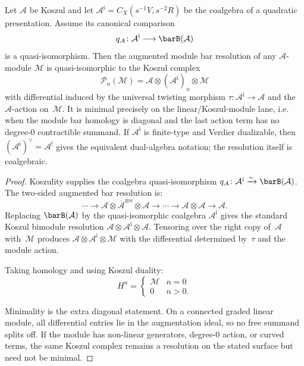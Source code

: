\begin{theorem}
\label{thm:koszul-resolution-module}
Let $\mathcal{A}$ be Koszul and let
$\mathcal{A}^{\mathrm{i}}=C_X(s^{-1}V,s^{-2}R)$ be the coalgebra of a
quadratic presentation.  Assume its canonical comparison
\[
 q_{\mathcal A}\colon\mathcal A^{\mathrm i}\longrightarrow
 \barB(\mathcal A)
\]
is a quasi-isomorphism. Then the augmented module bar resolution of any
$\mathcal{A}$-module $\mathcal{M}$ is quasi-isomorphic to the
Koszul complex
\[
\mathcal{P}_n(\mathcal{M}) =
\mathcal{A} \otimes (\mathcal{A}^{\mathrm{i}})_n
\otimes \mathcal{M}
\]
with differential induced by the universal twisting morphism
$\tau\colon\mathcal A^{\mathrm i}\to\mathcal A$ and the
$\mathcal A$-action on~$\mathcal M$. It is minimal precisely on the
linear/Koszul-module lane, i.e. when the module bar homology is
diagonal and the last action term has no degree-$0$ contractible
summand. If
$\mathcal{A}^{\mathrm{i}}$ is finite-type and Verdier dualizable, then
$(\mathcal{A}^{\mathrm{i}})^\vee=\mathcal{A}^!$ gives the equivalent
dual-algebra notation; the resolution itself is coalgebraic.
\end{theorem}

\begin{proof}
Koszulity supplies the coalgebra quasi-isomorphism
$q_{\mathcal A}\colon\mathcal A^{\mathrm i}\xrightarrow{\sim}
\barB(\mathcal A)$.
The two-sided augmented bar resolution is:
\[
\cdots \to
\mathcal{A} \otimes \overline{\mathcal{A}}^{\otimes n}
\otimes\mathcal A
\to \cdots \to
\mathcal{A}\otimes\mathcal A \to \mathcal{A}.
\]
Replacing $\barB(\mathcal A)$ by the quasi-isomorphic coalgebra
$\mathcal A^{\mathrm i}$ gives the standard Koszul bimodule
resolution
$\mathcal A\otimes\mathcal A^{\mathrm i}\otimes\mathcal A$.
Tensoring over the right copy of~$\mathcal A$ with~$\mathcal M$
produces
$\mathcal A\otimes\mathcal A^{\mathrm i}\otimes\mathcal M$ with
the differential determined by~$\tau$ and the module action.

Taking homology and using Koszul duality:
\[
H^n = \begin{cases} \mathcal M & n = 0 \\ 0 & n > 0. \end{cases}
\]

Minimality is the extra diagonal statement. On a connected graded
linear module, all differential entries lie in the augmentation ideal,
so no free summand splits off. If the module has non-linear
generators, degree-$0$ action, or curved terms, the same Koszul
complex remains a resolution on the stated surface but need not be
minimal.
\end{proof}

